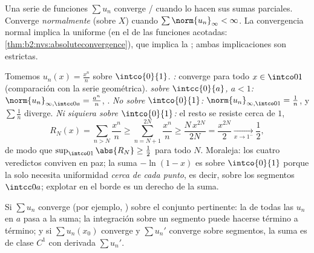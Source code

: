 \begin{definition}\label{def:b2:funcseq:series}
Una serie de funciones $\sum u_n$ converge
/ cuando lo hacen sus sumas parciales. Converge
\emph{normalmente} (sobre $X$) cuando
$\sum \norm{u_n}_\infty < \infty$. La convergencia normal implica la
uniforme (en el  de las funciones acotadas:
\cref{thm:b2:nvs:absoluteconvergence}), que implica la ;
ambas implicaciones son estrictas.
\end{definition}

\begin{example}\label{ex:b2:funcseq:threemodes}
Tomemos $u_n(x) = \frac{x^n}{n}$ sobre $\intco{0}{1}$.
\emph{:} converge para todo $x \in \intco01$
(comparación con la serie geométrica). \emph{ sobre
$\intcc{0}{a}$, $a < 1$:} $\norm{u_n}_{\infty,\intcc0a} =
\frac{a^n}{n}$, . \emph{No  sobre
$\intco{0}{1}$:} $\norm{u_n}_{\infty,\intco01} = \frac1n$, y
$\sum\frac1n$ diverge. \emph{Ni siquiera  sobre
$\intco{0}{1}$:} el resto se resiste cerca de $1$,
\[
R_N(x) = \sum_{n>N}\frac{x^n}{n}
\geq \sum_{n=N+1}^{2N}\frac{x^n}{n}
\geq \frac{N\,x^{2N}}{2N} = \frac{x^{2N}}{2}
\xrightarrow[x\to1^-]{} \frac12 ,
\]
de modo que $\sup_{\intco01}\abs{R_N} \geq \frac12$ para todo $N$.
Moraleja: los cuatro veredictos conviven en paz; la suma
$-\ln(1-x)$ es  sobre $\intco{0}{1}$ porque la 
solo necesita uniformidad \emph{cerca de cada punto}, es decir,
sobre los segmentos $\intcc0a$; explotar en el borde es un derecho de
la suma.
\end{example}

\begin{theorem}\label{thm:b2:funcseq:seriestransfer}
Si $\sum u_n$ converge  (por ejemplo, )
sobre el conjunto pertinente: la  de todas las $u_n$ en $a$
pasa a la suma; la integración sobre un segmento puede hacerse
término a término; y si $\sum u_n(x_0)$ converge y $\sum u_n'$
converge  sobre segmentos, la suma es de clase $C^1$ con
derivada $\sum u_n'$.
\end{theorem}


